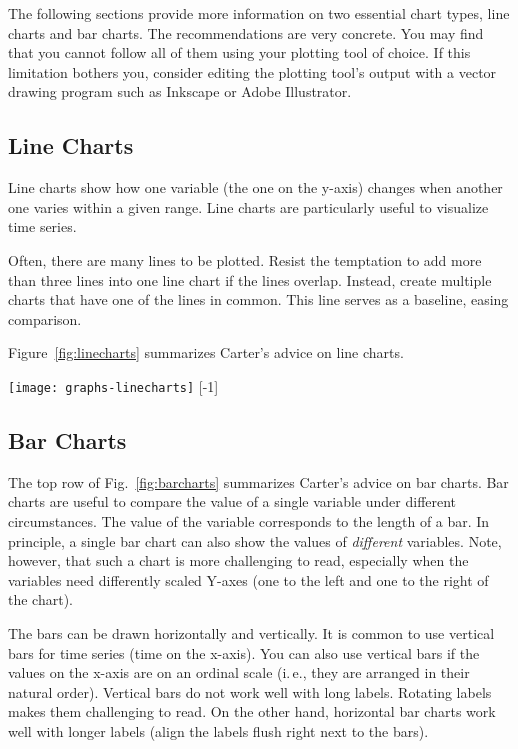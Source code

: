 The following sections provide more information on two essential chart types, line charts and bar charts. The recommendations are very concrete. You may find that you cannot follow all of them using your plotting tool of choice. If this limitation bothers you, consider editing the plotting tool's output with a vector drawing program such as Inkscape or Adobe Illustrator.

\subsection{Line Charts}

Line charts show how one variable (the one on the y-axis) changes when another one varies within a given range. Line charts are particularly useful to visualize time series.

Often, there are many lines to be plotted. Resist the temptation to add more than three lines into one line chart if the lines overlap. Instead, create multiple charts that have one of the lines in common. This line serves as a baseline, easing comparison.

Figure~\ref{fig:linecharts} summarizes Carter's advice on line charts.

\begin{figure*}[t]
\centering
\texttt{[image: graphs-linecharts]}
[-1\baselineskip]
\end{figure*}

\subsection{Bar Charts}

The top row of Fig.~\ref{fig:barcharts} summarizes Carter's advice on bar charts.
Bar charts are useful to compare the value of a single variable under different circumstances. The value of the variable corresponds to the length of a bar. In principle, a single bar chart can also show the values of \emph{different} variables. Note, however, that such a chart is more challenging to read, especially when the variables need differently scaled Y-axes (one to the left and one to the right of the chart).

The bars can be drawn horizontally and vertically. It is common to use vertical bars for time series (time on the x-axis). You can also use vertical bars if the values on the x-axis are on an ordinal scale (i.\,e., they are arranged in their natural order). Vertical bars do not work well with long labels. Rotating labels makes them challenging to read. On the other hand, horizontal bar charts work well with longer labels (align the labels flush right next to the bars).

